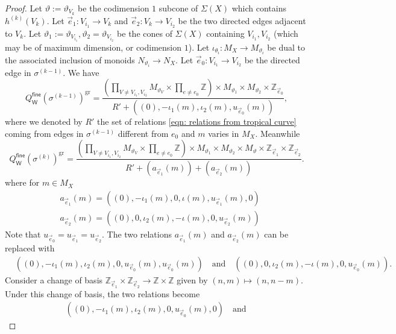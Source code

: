 \documentclass{article}
\newcommand{\gr}{\mathrm{gr}}
\newcommand{\fine}{\mathsf{fine}}
\newcommand{\W}{\mathsf{W}}
\begin{document}
\begin{proof}
    Let $\vartheta:=\vartheta_{V_k}$ be the codimension $1$ subcone of $\Sigma(X)$ which contains $h^{(k)}(V_k)$. Let  $\vec{e}_1 \colon V_{i_1} \rightarrow V_k$ and $\vec{e}_2 \colon V_k \rightarrow V_{i_2}$ be the two directed edges adjacent to $V_k$. Let $\vartheta_1:= \vartheta_{V_{i_1}}, \vartheta_2=\vartheta_{V_{i_2}} $ be the cones of $\Sigma(X)$ containing $V_{i_1}, V_{i_2}$ (which may be of maximum dimension, or codimension $1$). Let $\iota_{\theta_i} :  M_X  \rightarrow M_{\vartheta_i}$ be dual to the associated inclusion of monoids $N_{\vartheta_i} \rightarrow N_X$. Let $\vec{e}_0 \colon V_{i_1} \rightarrow V_{i_2}$ be the directed edge in $\sigma^{(k-1)}$. We have 
    $$Q_{\W}^{\fine}(\sigma^{(k-1)})^{\gr} = \frac{(\prod_{V \neq V_{i_1}, V_{i_2}} M_{\vartheta_V} \times \prod_{e \neq e_0} \mathbb{Z}) \times M_{\vartheta_1} \times M_{\vartheta_2} \times  \mathbb{Z}_{\vec{e}_0}}{R' + ((0), -\iota_1(m), \iota_2(m), u_{\vec{e}_0}(m))},$$
    where we denoted by $R'$ the set of relations \eqref{eqn: relations from tropical curve} coming from edges in $\sigma^{(k-1)}$ different from $e_0$ and $m$ varies in $M_X$. Meanwhile  
    $$Q_{\W}^{\fine}(\sigma^{(k)})^{\gr} = \frac{(\prod_{V \neq V_{i_1}, V_{i_2}} M_{\vartheta_V} \times \prod_{e \neq e_0} \mathbb{Z}) \times M_{\vartheta_1} \times M_{\vartheta_2}  \times M_{\vartheta} \times \mathbb{Z}_{\vec{e}_1} \times \mathbb{Z}_{\vec{e}_2} }{R' + (a_{\vec{e}_1}(m)) + (a_{\vec{e}_2}(m))}.$$
    where for $m \in M_X$
    \begin{align*}
        &a_{\vec{e}_1}(m) = ((0), -\iota_1(m), 0 , \iota(m),  u_{\vec{e}_1}(m), 0)\\
        &a_{\vec{e}_2}(m) = ((0), 0, \iota_2(m) , -\iota(m), 0, u_{\vec{e}_2}(m))
    \end{align*}
    Note that $u_{\vec{e}_0} = u_{\vec{e}_1} = u_{\vec{e}_2}$. The two relations $a_{\vec{e}_1}(m)$ and $a_{\vec{e}_2}(m)$ can be replaced with 
    \begin{align*}
        &((0), -\iota_1(m), \iota_2(m),  0,  u_{\vec{e}_0}(m), u_{\vec{e}_0}(m))  \quad \text{and} \quad
        ((0), 0, \iota_2(m) , -\iota(m), 0, u_{\vec{e}_0}(m)). 
    \end{align*}
    Consider a change of basis $\mathbb{Z}_{\vec{e}_1} \times \mathbb{Z}_{\vec{e}_2} \rightarrow \mathbb{Z} \times \mathbb{Z}$ given by $(n,m) \mapsto (n, n-m)$. Under this change of basis, the two relations become 
    \begin{align*}
            &((0), -\iota_1(m), \iota_2(m),  0,  u_{\vec{e}_0}(m), 0)  \quad \text{and} \quad

\end{align*}
\end{proof}
\end{document}
